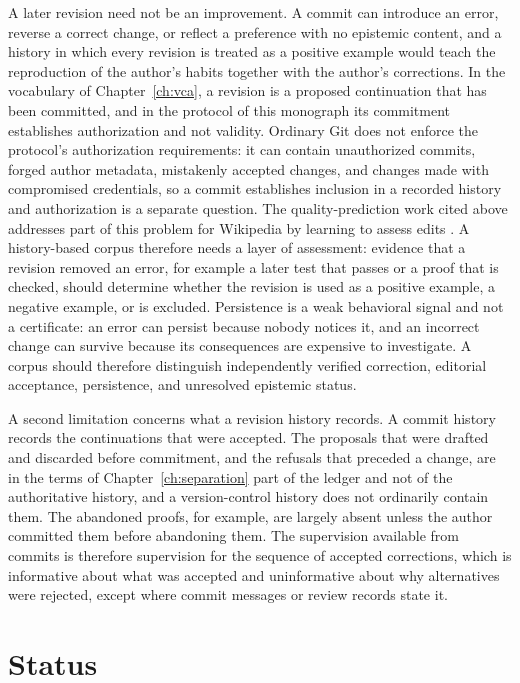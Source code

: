 \documentclass[12pt,oneside,openany]{book}
\theoremstyle{spherepop}
\theoremstyle{remarkstyle}
\begin{document}
A later revision need not be an improvement. A commit can introduce an error, reverse a correct change, or reflect a preference with no epistemic content, and a history in which every revision is treated as a positive example would teach the reproduction of the author's habits together with the author's corrections. In the vocabulary of Chapter~\ref{ch:vca}, a revision is a proposed continuation that has been committed, and in the protocol of this monograph its commitment establishes authorization and not validity. Ordinary Git does not enforce the protocol's authorization requirements: it can contain unauthorized commits, forged author metadata, mistakenly accepted changes, and changes made with compromised credentials, so a commit establishes inclusion in a recorded history and authorization is a separate question. The quality-prediction work cited above addresses part of this problem for Wikipedia by learning to assess edits \cite{sarkar}. A history-based corpus therefore needs a layer of assessment: evidence that a revision removed an error, for example a later test that passes or a proof that is checked, should determine whether the revision is used as a positive example, a negative example, or is excluded. Persistence is a weak behavioral signal and not a certificate: an error can persist because nobody notices it, and an incorrect change can survive because its consequences are expensive to investigate. A corpus should therefore distinguish independently verified correction, editorial acceptance, persistence, and unresolved epistemic status.

A second limitation concerns what a revision history records. A commit history records the continuations that were accepted. The proposals that were drafted and discarded before commitment, and the refusals that preceded a change, are in the terms of Chapter~\ref{ch:separation} part of the ledger and not of the authoritative history, and a version-control history does not ordinarily contain them. The abandoned proofs, for example, are largely absent unless the author committed them before abandoning them. The supervision available from commits is therefore supervision for the sequence of accepted corrections, which is informative about what was accepted and uninformative about why alternatives were rejected, except where commit messages or review records state it.

\section{Status}
\end{document}

